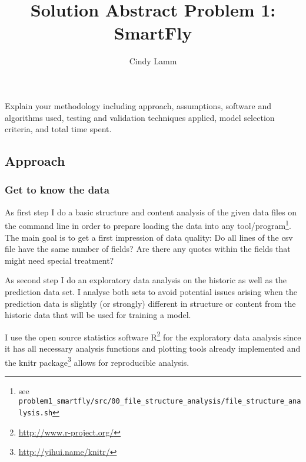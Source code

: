 \documentclass[12pt,a4paper]{article}
\author{Cindy Lamm}
\title{Solution Abstract Problem 1: SmartFly}
\begin{document}
\VerbatimFootnotes
\maketitle

Explain your methodology including approach, assumptions, software and algorithms used, testing and validation techniques applied, model selection criteria, and total time spent.

\subsection{Approach}

\subsubsection{Get to know the data}

As first step I do a basic structure and content analysis of the given data files on the command line in order to prepare loading the data into any tool/program\footnote{see \verb+problem1_smartfly/src/00_file_structure_analysis/file_structure_analysis.sh+ }. The main goal is to get a first impression of data quality: Do all lines of the csv file have the same number of fields? Are there any quotes within the fields that might need special treatment?

As second step I do an exploratory data analysis on the historic as well as the prediction data set. I analyse both sets to avoid potential issues arising when the prediction data is slightly (or strongly) different in structure or content from the historic data that will be used for training a model. 

I use the open source statistics software R\footnote{\url{http://www.r-project.org/}} for the exploratory data analysis since it has all necessary analysis functions and plotting tools already implemented and the knitr package\footnote{\url{http://yihui.name/knitr/}} allows for reproducible analysis.
\end{document}
